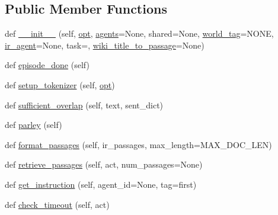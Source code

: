 \subsection*{Public Member Functions}
\begin{DoxyCompactItemize}
\item 
def \hyperlink{classworlds_1_1MTurkWizardOfWikipediaWorld_a63cc7094d112761f6f4b1d0e9450da65}{\+\_\+\+\_\+init\+\_\+\+\_\+} (self, \hyperlink{classparlai_1_1core_1_1worlds_1_1World_a3640d92718acd3e6942a28c1ab3678bd}{opt}, \hyperlink{classworlds_1_1MTurkWizardOfWikipediaWorld_ad379b376ca949228453ed6340b93da89}{agents}=None, shared=None, \hyperlink{classworlds_1_1MTurkWizardOfWikipediaWorld_a285ebfae1d64f9535e4142dba8069fa2}{world\+\_\+tag}=\textquotesingle{}N\+O\+NE\textquotesingle{}, \hyperlink{classworlds_1_1MTurkWizardOfWikipediaWorld_ade9f0ec53fc216d66d1028ddef048454}{ir\+\_\+agent}=None, task=\textquotesingle{}\textquotesingle{}, \hyperlink{classworlds_1_1MTurkWizardOfWikipediaWorld_aabcfa4f0477fd7f62392cb2ba91e0ed8}{wiki\+\_\+title\+\_\+to\+\_\+passage}=None)
\item 
def \hyperlink{classworlds_1_1MTurkWizardOfWikipediaWorld_aae637ce288e90d30e654557b0b2165f8}{episode\+\_\+done} (self)
\item 
def \hyperlink{classworlds_1_1MTurkWizardOfWikipediaWorld_adeec00a2a46a1bebabc3d57d16ec5ac9}{setup\+\_\+tokenizer} (self, \hyperlink{classparlai_1_1core_1_1worlds_1_1World_a3640d92718acd3e6942a28c1ab3678bd}{opt})
\item 
def \hyperlink{classworlds_1_1MTurkWizardOfWikipediaWorld_a4b49dac2356a6684979f3b4c81057773}{sufficient\+\_\+overlap} (self, text, sent\+\_\+dict)
\item 
def \hyperlink{classworlds_1_1MTurkWizardOfWikipediaWorld_ad49b2e40a83896f6d0e67928f661d1c1}{parley} (self)
\item 
def \hyperlink{classworlds_1_1MTurkWizardOfWikipediaWorld_a2b08068e94df414f15e2173d5e8bd20b}{format\+\_\+passages} (self, ir\+\_\+passages, max\+\_\+length=M\+A\+X\+\_\+\+D\+O\+C\+\_\+\+L\+EN)
\item 
def \hyperlink{classworlds_1_1MTurkWizardOfWikipediaWorld_a7c581b582a8770ebbf4b1c343dd68f3d}{retrieve\+\_\+passages} (self, act, num\+\_\+passages=None)
\item 
def \hyperlink{classworlds_1_1MTurkWizardOfWikipediaWorld_a99b976d4f864256d99873f88933632c0}{get\+\_\+instruction} (self, agent\+\_\+id=None, tag=\textquotesingle{}first\textquotesingle{})
\item 
def \hyperlink{classworlds_1_1MTurkWizardOfWikipediaWorld_a79a5b5c3295a41bf9f35b6fa3e8b0d85}{check\+\_\+timeout} (self, act)

\end{DoxyCompactItemize}
